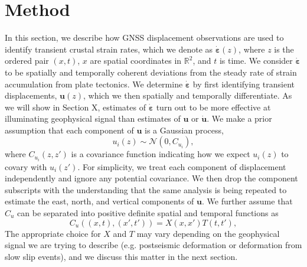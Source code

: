 \documentclass[10pt,a4paper]{article}
\begin{document}
\section{Method}\label{sec:Method}
In this section, we describe how GNSS displacement observations are used to identify transient crustal strain rates, which we denote as $\dot{\bm{\varepsilon}}(z)$, where $z$ is the ordered pair $(x,t)$, $x$ are spatial coordinates in $\mathbb{R}^2$, and $t$ is time. We consider $\dot{\bm{\varepsilon}}$ to be spatially and temporally coherent deviations from the steady rate of strain accumulation from plate tectonics. We determine $\dot{\bm{\varepsilon}}$ by first identifying transient displacements, $\bm{u}(z)$, which we then spatially and temporally differentiate.  As we will show in Section X, estimates of $\dot{\bm{\varepsilon}}$ turn out to be more effective at illuminating geophysical signal than estimates of $\bm{u}$ or $\dot{\bm{u}}$.  We make a prior assumption that each component of $\bm{u}$ is a Gaussian process,
\begin{equation}\label{eq:TransientDeformation}
u_i(z) \sim \mathcal{N}\left(0,C_{u_i}\right),
\end{equation}
where $C_{u_i}(z,z')$ is a covariance function indicating how we expect $u_i(z)$ to covary with $u_i(z')$. For simplicity, we treat each component of displacement independently and ignore any potential covariance. We then drop the component subscripts with the understanding that the same analysis is being repeated to estimate the east, north, and vertical components of $\bm{u}$. We further assume that $C_u$ can be separated into positive definite spatial and temporal functions as 
\begin{equation}\label{eq:TransientCovariance}
C_{u}\left((x,t),(x',t')\right) = X(x,x')T(t,t'),
\end{equation}  
The appropriate choice for $X$ and $T$ may vary depending on the geophysical signal we are trying to describe (e.g. postseismic deformation or deformation from slow slip events), and we discuss this matter in the next section.  
\end{document}
